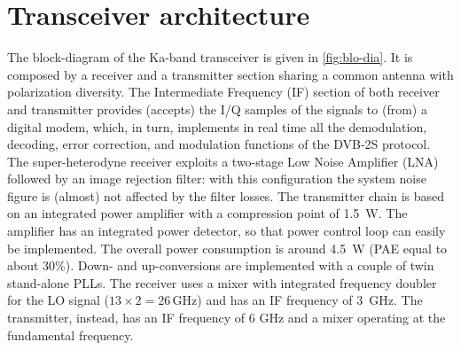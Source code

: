 \documentclass[conference,10pt,a4paper]{IEEEtran}%
\begin{document}
\section{Transceiver architecture}
The block-diagram of the Ka-band transceiver is given in \cref{fig:blo-dia}.
It is composed by a receiver and a transmitter section sharing a common antenna with polarization diversity.
The Intermediate Frequency (IF) section of both receiver and transmitter provides (accepts) the I/Q samples of the signals to (from) a digital modem, which, in turn, implements in real time all the demodulation, decoding, error correction, and modulation functions of the DVB-2S protocol.
The super-heterodyne receiver exploits a two-stage Low Noise Amplifier (LNA) followed by an image rejection filter: with this configuration the system noise figure is (almost) not affected by the filter losses.
The transmitter chain is based on an integrated power amplifier with a compression point of 1.5~W.
The amplifier has an integrated power detector, so that power control loop can easily be implemented.
The overall power consumption is around 4.5~W (PAE equal to about 30\%).
Down- and up-conversions are implemented with a couple of twin stand-alone PLLs.
The receiver uses a mixer with integrated frequency doubler for the LO signal ($13 \times 2=26\,\mbox{GHz}$) and has an IF frequency of 3~GHz.
The transmitter, instead, has an IF frequency of 6 GHz and a mixer operating at the fundamental frequency.
\end{document}
